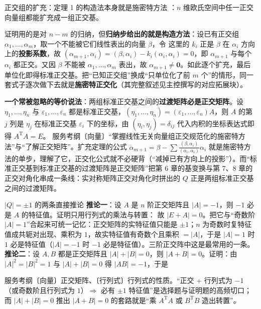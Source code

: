 \begin{fdeep}{正交组的扩充：定理 1 的构造法本身就是施密特方法}
：$n$ 维欧氏空间中任一正交向量组都能扩充成一组正交基。

证明用的是对 $n-m$ 的归纳，但\textbf{归纳步给出的就是构造方法}：设已有正交组 $\alpha_1,\dots,\alpha_m$，取一个不能被它们线性表出的向量 $\beta$，令
这里的 $k_i$ 正是 $\beta$ 在 $\alpha_i$ 方向上的\textbf{投影系数}，故 $(\alpha_{m+1},\alpha_i)=(\beta,\alpha_i)-k_i(\alpha_i,\alpha_i)=0$，即 $\alpha_{m+1}$ 与每个 $\alpha_i$ 都正交。又因 $\beta$ 不能被 $\alpha_1,\dots,\alpha_m$ 表出，故 $\alpha_{m+1}\ne\mathbf{0}$。如此逐个扩充，最后单位化即得标准正交基。把“已知正交组”换成“只单位化了前 $m$ 个”的情形，同一套式子逐次做下去就是\textbf{施密特正交化}（其完整叙述见主控撰写的对应拓展块）。

\textbf{一个常被忽略的等价说法}：两组标准正交基之间的\textbf{过渡矩阵必是正交矩阵}。设 $\eta_1,\dots,\eta_n$ 与 $\varepsilon_1,\dots,\varepsilon_n$ 都是标准正交基，$(\eta_1,\dots,\eta_n)=(\varepsilon_1,\dots,\varepsilon_n)A$，则 $A$ 的第 $j$ 列是 $\eta_j$ 在标准正交基 $\varepsilon_i$ 下的坐标，由 $(\eta_i,\eta_j)=\delta_{ij}$ 代入内积的坐标表达式即得 $A^{\mathrm T}A=E$。
\fbref{}服务考纲〔向量〕“掌握线性无关向量组正交规范化的施密特方法”与“了解正交矩阵”。扩充定理的公式 $\alpha_{m+1}=\beta-\sum\frac{(\beta,\alpha_i)}{(\alpha_i,\alpha_i)}\alpha_i$ 就是施密特方法的单步，理解了它，正交化公式就不必硬背（“减掉已有方向上的投影”）。而“标准正交基到标准正交基的过渡矩阵是正交矩阵”把第 6 章的基变换与第 7、8 章的正交对角化串成一条线：实对称矩阵正交对角化时拼出的 $Q$ 正是两组标准正交基之间的过渡矩阵。
\end{fdeep}

\begin{fdeep}{$|Q|=\pm1$ 的两条直接推论}
\textbf{推论一}：设 $A$ 是 $n$ 阶正交矩阵且 $|A|=-1$，则 $-1$ 必是 $A$ 的特征值。证明只用行列式的乘法与转置：
故 $|E+A|=0$。把它与“奇数阶 $|A|=1$”合起来可统一记忆：正交矩阵的实特征值只能是 $\pm1$；$n$ 为奇数时复特征值成共轭对出现、乘积为 $1$，故实特征值有奇数个且乘积 $=|A|$，于是 $|A|=1$ 时 $1$ 必是特征值（$|A|=-1$ 时 $-1$ 必是特征值）。三阶正交阵中这是最常用的一条。
\textbf{推论二}：设 $A,B$ 都是正交矩阵且 $|A|+|B|=0$，则 $|A+B|=0$。证明：由 $|A|^{2}=|B|^{2}=1$ 与 $|A|+|B|=0$ 得 $|AB|=-1$，于是

\fbref{}服务考纲〔向量〕正交矩阵、〔行列式〕行列式的性质。“正交 + 行列式为 $-1$（或奇数阶且行列式为 $1$）$\Rightarrow$ 必有 $\pm1$ 特征值”是选择题与证明题的高频切口；而 $|A|+|B|=0$ 推出 $|A+B|=0$ 的套路就是“乘 $A^{\mathrm T}A$ 或 $B^{\mathrm T}B$ 造出转置”。
\end{fdeep}

